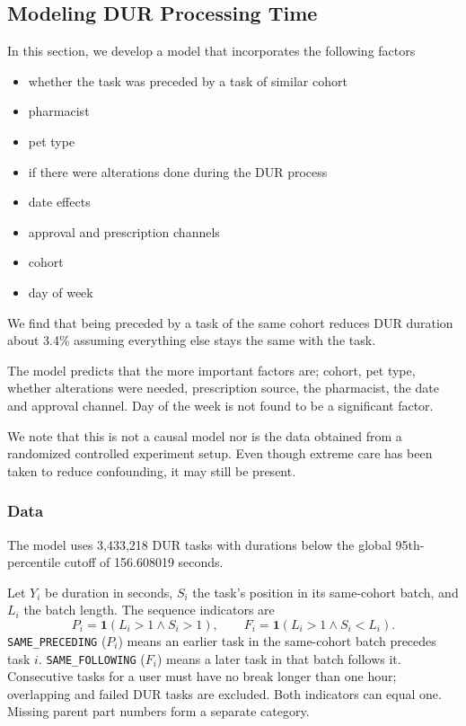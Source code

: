 \subsection{Modeling DUR Processing Time}\label{modeling-dur-processing-time}
In this section, we develop a model that incorporates the following factors
\begin{itemize}
\item whether the task was preceded by a task of similar cohort
\item pharmacist
\item pet type
\item if there were alterations done during the DUR process
\item date effects
\item approval and prescription channels
\item cohort
\item day of week
\end{itemize}

We find that being preceded by a task of the same cohort reduces DUR
duration about 3.4\% assuming everything else stays the same with the
task.

The model predicts that the more important factors are; cohort, pet
type, whether alterations were needed, prescription source, the
pharmacist, the date and approval channel. Day of the week is not
found to be a significant factor.

We note that this is not a causal model nor is the data obtained
from a randomized controlled experiment setup. Even though extreme
care has been taken to reduce confounding, it may still be present.

\subsubsection{Data}
The model uses 3,433,218 DUR tasks with durations below the global 95th-percentile cutoff of
156.608019 seconds.

Let \(Y_i\) be duration in seconds, \(S_i\) the
task's position in its same-cohort batch, and \(L_i\) the batch length.
The sequence indicators are
\[
P_i=\mathbf{1}(L_i>1\land S_i>1),\qquad
F_i=\mathbf{1}(L_i>1\land S_i<L_i).
\]
\texttt{SAME\_PRECEDING} (\(P_i\)) means an earlier task in the
same-cohort batch precedes task \(i\). \texttt{SAME\_FOLLOWING}
(\(F_i\)) means a later task in that batch follows it. Consecutive
tasks for a user must have no break longer than one hour; overlapping
and failed DUR tasks are excluded. Both indicators can equal one.
Missing parent part numbers form a separate category.

